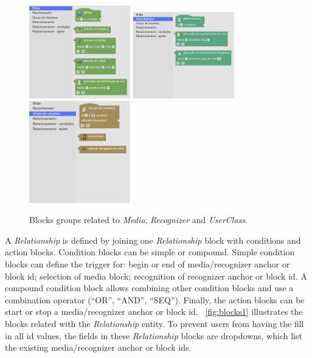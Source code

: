 \documentclass[
  doutorado,
  american
]{ThesisPUC}
\newcommand{\fig}[1]{\figurename~\ref{#1}}
\newcommand{\captionvspace}{\vspace{-1.3em}}
\begin{document}
\begin{figure}[!ht]
\begin{center}
	\includegraphics[width=4.4cm, keepaspectratio]{img/img13a.png}
	\includegraphics[width=4.4cm, keepaspectratio]{img/img13b.png}
	\includegraphics[width=4.4cm, keepaspectratio]{img/img13c.png}
	\caption{Blocks groups related to \textit{Media}, \textit{Recognizer} and 
	\textit{UserClass}.}
	\label{fig:blocksgroups}
	\captionvspace
\end{center}
\end{figure}

A \textit{Relationship} is defined by joining one \textit{Relationship} block
with conditions and action blocks. Condition blocks can be simple or
compound. Simple condition blocks can define the trigger for: begin or end of
media/recognizer anchor or block id; selection of media block; recognition of
recognizer anchor or block id. A compound condition block allows combining other
condition blocks and use a combination operator (“OR”, “AND”, “SEQ”). Finally,
the action blocks can be start or stop a media/recognizer anchor or block id.
\fig{fig:blocks1} illustrates the blocks related with the \textit{Relationship}
entity. To prevent users from having the fill in all id values, the fields in
these \textit{Relationship} blocks are dropdowns, which list the existing
media/recognizer anchor or block ids.
\end{document}
